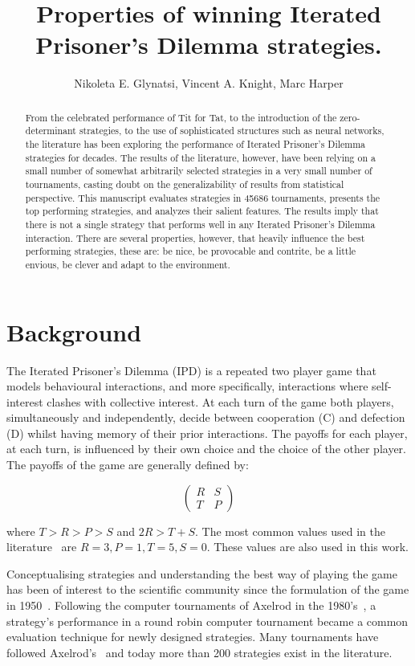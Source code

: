 \documentclass{article}
\title{Properties of winning Iterated Prisoner's Dilemma strategies.}
\author{Nikoleta E. Glynatsi, Vincent A. Knight, Marc Harper}
\date{}
\newcommand{\numberofstrategies}{}
\begin{document}
\maketitle

\begin{abstract}
From the celebrated performance of Tit for Tat, to the
introduction of the zero-determinant strategies, to the use of sophisticated
structures such as neural networks, the literature has been exploring the
performance of Iterated Prisoner's Dilemma strategies for decades. The results of the literature,
however, have been relying on a small number of somewhat arbitrarily selected
strategies in a very small number of tournaments,
casting doubt on the generalizability of results from statistical perspective.
This manuscript evaluates \numberofstrategies strategies in 45686
tournaments, presents the top performing strategies, and analyzes their
salient features. The results imply that there is not a single
strategy that performs well in any Iterated Prisoner's Dilemma interaction.
There are several properties, however, that heavily influence the best performing
strategies, these are: be nice, be provocable and contrite, be a little envious, be clever
and adapt to the environment.
\end{abstract}

\section{Background}

The Iterated Prisoner's Dilemma (IPD) is a repeated two player game that models
behavioural interactions, and more specifically, interactions where
self-interest clashes with collective interest. At each turn of the game both
players, simultaneously and independently, decide between cooperation (C) and
defection (D) whilst having memory of their prior interactions. The payoffs for each
player, at each turn, is influenced by their own choice and the choice of the
other player. The payoffs of the game are generally defined by:

\[\begin{pmatrix}
R & S \\
T & P
\end{pmatrix}\]

where \(T > R > P > S\) and \(2R > T + S\). The most common values used in
the literature~\cite{Axelrod1981} are $R=3, P=1, T=5, S=0$. These values are also
used in this work.

Conceptualising strategies and understanding the best way of playing the game
has been of interest to the scientific community since the formulation of the
game in 1950~\cite{Flood1958}. Following the computer tournaments of Axelrod in the
1980's~\cite{Axelrod1980a, Axelrod1980b}, a strategy's performance in a round
robin computer tournament became a common evaluation technique for newly designed
strategies. Many tournaments have followed Axelrod's~\cite{Bendor1991,
Harper2017, Kendall2007, Stephens2002, Stewart2012} and today more than 200
strategies exist in the literature.
\end{document}
